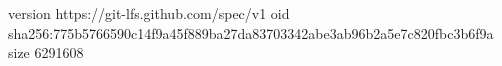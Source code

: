 version https://git-lfs.github.com/spec/v1
oid sha256:775b5766590c14f9a45f889ba27da83703342abe3ab96b2a5e7c820fbc3b6f9a
size 6291608
